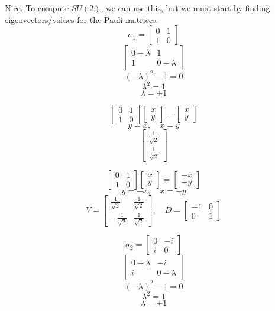 \documentclass{article}
\begin{document}
Nice. To compute $SU(2)$, we can use this, but we must start by finding eigenvectors/values for the Pauli matrices: 
\[ \sigma_1 = \begin{bmatrix} 0 & 1 \\ 1 & 0 \end{bmatrix}  \]
\[ \begin{bmatrix} 0-\lambda & 1 \\ 1 & 0-\lambda \end{bmatrix}  \]
\[ (-\lambda)^2 -1 = 0 \]
\[ \lambda^2 = 1 \]
\[ \lambda = \pm 1 \]

\[ \begin{bmatrix} 0 & 1 \\ 1 & 0 \end{bmatrix} \begin{bmatrix}
    x \\ y
\end{bmatrix} = \begin{bmatrix}
    x \\ y
\end{bmatrix} \]
\[ y = x, \quad x = y \]
\[ \begin{bmatrix}
    \frac{1}{\sqrt{2}} \\ \frac{1}{\sqrt{2}}
\end{bmatrix} \]

\[ \begin{bmatrix} 0 & 1 \\ 1 & 0 \end{bmatrix} \begin{bmatrix}
    x \\ y
\end{bmatrix} = \begin{bmatrix}
    -x \\ -y
\end{bmatrix} \]
\[ y = -x, \quad x = -y \]
\[ V = \begin{bmatrix}
    \frac{1}{\sqrt{2}} & \frac{1}{\sqrt{2}} \\ 
    -\frac{1}{\sqrt{2}} & \frac{1}{\sqrt{2}}
\end{bmatrix}, \quad D = \begin{bmatrix}
    -1 & 0 \\ 0 & 1 
\end{bmatrix} \]

\[ \sigma_2 = \begin{bmatrix}
    0 & -i \\ 
    i & 0
\end{bmatrix} \]
\[ \begin{bmatrix}
    0 - \lambda & -i \\ 
    i & 0 - \lambda
\end{bmatrix} \]
\[ (-\lambda)^2 - 1 = 0 \]
\[ \lambda^2 = 1 \]
\[ \lambda = \pm 1 \]
\end{document}
